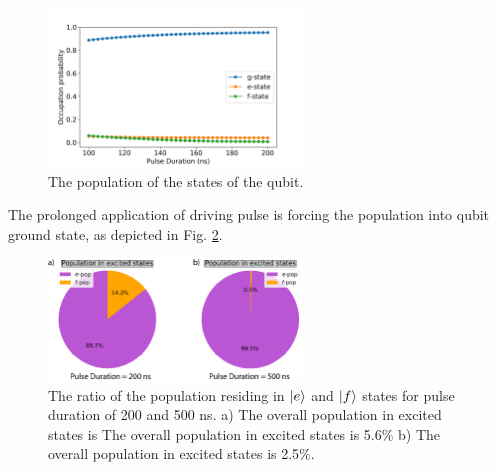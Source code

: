 \begin{figure}[h!]
    \centering
    \includegraphics[width=0.6\textwidth]{pic/different_reset_schemes/gef_pops.png}
    \caption{The population of the states of the qubit.}
    \label{fig:tau_sweep_qubit_states}
\end{figure}

The prolonged application of driving pulse is forcing the population into qubit ground state, as depicted in Fig. \ref{fig:tau_sweep_qubit_states}. 




















\begin{figure}[h!]
    \centering
    \includegraphics[width=0.6\textwidth]{pic/different_reset_schemes/dist_exc_tau_sweep.eps}
    \caption{The ratio of the population residing in $\ket{e}$ and $\ket{f}$ states for pulse duration of 200 and 500 ns. a) The overall population in excited states is The overall population in excited states is 5.6$\%$  b) The overall population in excited states is 2.5$\%$.}
    \label{fig:tau_sweep_qubit_states}
\end{figure}



























